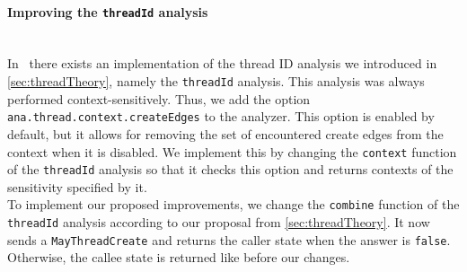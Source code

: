     \paragraph{Improving the \texttt{threadId} analysis}\mbox{}\\
    In \gob\ there exists an implementation of the thread ID analysis we introduced in \autoref{sec:threadTheory}, namely the \texttt{threadId} analysis. This analysis was always performed context-sensitively. Thus, we add the option \texttt{ana.thread.context.createEdges} to the analyzer. This option is enabled by default, but it allows for removing the set of encountered create edges from the context when it is disabled. We implement this by changing the \texttt{context} function of the \texttt{threadId} analysis so that it checks this option and returns contexts of the sensitivity specified by it.\\
    To implement our proposed improvements, we change the \texttt{combine} function of the \texttt{threadId} analysis according to our proposal from \autoref{sec:threadTheory}. It now sends a \texttt{MayThreadCreate} and returns the caller state when the answer is \texttt{false}. Otherwise, the callee state is returned like before our changes.

